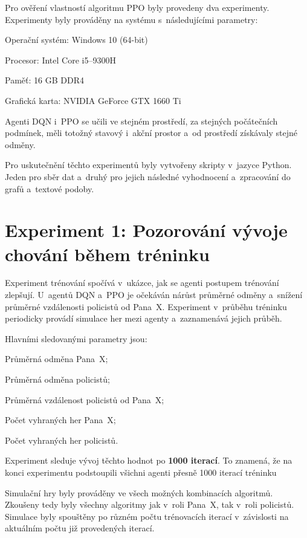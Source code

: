 Pro ověření vlastností algoritmu PPO byly provedeny dva experimenty.
Experimenty byly prováděny na systému s~následujícími parametry:

\begin{myitemize}
  \item Operační systém: Windows 10 (64-bit)
  \item Procesor: Intel Core i5--9300H
  \item Paměť: 16 GB DDR4
  \item Grafická karta: NVIDIA GeForce GTX 1660 Ti
\end{myitemize}

Agenti DQN i~PPO se učili ve stejném prostředí, za stejných počátečních podmínek, měli totožný stavový i~akční prostor a~od prostředí získávaly stejné odměny.

Pro uskutečnění těchto experimentů byly vytvořeny skripty v~jazyce Python.
Jeden pro sběr dat a~druhý pro jejich následné vyhodnocení a~zpracování do grafů a~textové podoby.

\section{Experiment 1: Pozorování vývoje chování během tréninku}
\label{sec:experiment-1}

Experiment trénování spočívá v~ukázce, jak se agenti postupem trénování zlepšují.
U~agentů DQN a~PPO je očekáván nárůst průměrné odměny a~snížení průměrné vzdálenosti policistů od Pana~X\@.
Experiment v~průběhu tréninku periodicky provádí simulace her mezi agenty a~zaznamenává jejich průběh.

\bigskip
\noindent Hlavními sledovanými parametry jsou:
\begin{myitemize}
  \item Průměrná odměna Pana~X;
  \item Průměrná odměna policistů;
  \item Průměrná vzdálenost policistů od Pana~X;
  \item Počet vyhraných her Pana~X;
  \item Počet vyhraných her policistů.
\end{myitemize}
Experiment sleduje vývoj těchto hodnot po \textbf{1000 iterací}.
To znamená, že na konci experimentu podstoupili všichni agenti přesně 1000 iterací tréninku

Simulační hry byly prováděny ve všech možných kombinacích algoritmů.
Zkoušeny tedy byly všechny algoritmy jak v~roli Pana~X, tak v~roli policistů.
Simulace byly spouštěny po různém počtu trénovacích iterací v~závislosti na aktuálním počtu již provedených iterací.\pagebreak

